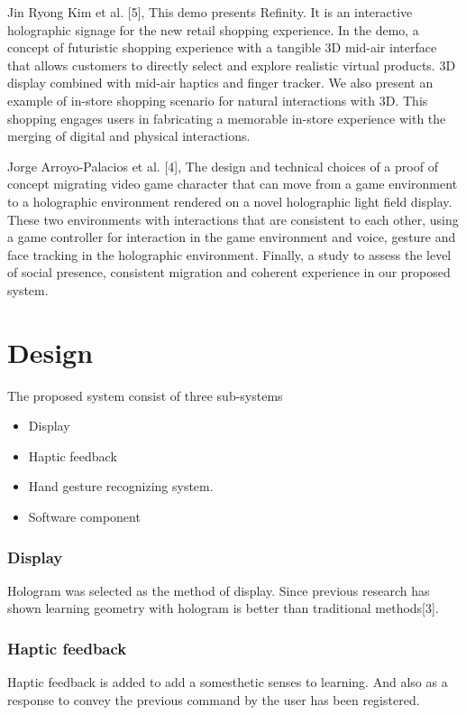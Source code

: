 \documentclass{fisatproject}
\begin{document}
\par Jin Ryong Kim et al. [5], This demo presents Refinity. It is an interactive holographic signage for the new retail shopping experience. In the demo,  a concept of futuristic shopping experience with a tangible 3D mid-air interface that allows customers to directly select and explore realistic virtual products. 3D display combined with mid-air haptics and finger tracker. We also present an example of in-store shopping scenario for natural interactions with 3D. This shopping  engages users in fabricating a memorable in-store experience with the merging of digital and physical interactions.
\par Jorge Arroyo-Palacios et al. [4],   The design and technical choices of a proof of concept migrating video game character that can move from a game environment to a holographic environment rendered on a novel holographic light field display.  These two environments with interactions that are consistent to each other, using a game controller for interaction in the game environment and voice, gesture and face tracking in the holographic environment. Finally,  a study to assess the level of social presence, consistent migration and coherent experience in our proposed system.

\chapter{Design}

The proposed system consist of three sub-systems
\begin{itemize}
    \item  Display
    \item Haptic feedback
    \item Hand gesture recognizing system.
    \item Software component
\end{itemize}
\subsection{Display}
Hologram was selected as the method of display. Since previous  research has shown learning geometry with hologram is better than traditional methods[3].

\subsection{Haptic feedback}
Haptic feedback is added to add a somesthetic senses to learning. And also as a response to convey the previous command by the user has been registered.
\end{document}
